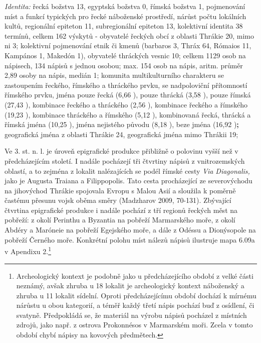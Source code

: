 {\em Identita:} řecká božstva 13, egyptská božstva 0, římská božstva 1, pojmenování míst a funkcí typických pro řecké náboženské prostředí, nárůst počtu lokálních kultů, regionální epiteton 11, subregionální epiteton 13, kolektivní identita 38 termínů, celkem 162 výskytů - obyvatelé řeckých obcí z oblasti Thrákie 20, mimo ni 3; kolektivní pojmenování etnik či kmenů (barbaros 3, Thráx 64, Rómaios 11, Kampános 1, Makedón 1), obyvatelé thráckých vesnic 10; celkem 1129 osob na nápisech, 134 nápisů s jednou osobou; max. 154 osob na nápis, aritm. průměr 2,89 osoby na nápis, medián 1; komunita multikulturního charakteru se zastoupením řeckého, římského a thráckého prvku, se nadpoloviční přítomností římského prvku, jména pouze řecká (6,66 ), pouze thrácká (3,58 ), pouze římská (27,43 ), kombinace řeckého a thráckého (2,56 ), kombinace řeckého a římského (19,23 ), kombinace thráckého a římského (5,12 ), kombinovaná řecká, thrácká a římská jména (10,25 ), jména nejistého původu (8,18 ), beze jména (16,92 ){\bf ;} geografická jména z oblasti Thrákie 24, geografická jména mimo Thrákii 19;

\NC\AR
\HL
\HL
\stoptable

Ve 3. st. n. l. je úroveň epigrafické produkce přibližně o polovinu vyšší než v předcházejícím století. I nadále pocházejí tři čtvrtiny nápisů z vnitrozemských oblastí, a to zejména z lokalit nalézajících se podél římské cesty {\em Via Diagonalis,} jako je Augusta Traiana a Filippopolis. Tato cesta procházející ze severovýchodu na jihovýchod Thrákie spojovala Evropu s Malou Asií a sloužila k poměrně častému přesunu vojsk oběma směry (Madzharov 2009, 70-131). Zbývající čtvrtina epigrafické produkce i nadále pochází z tří regionů řeckých měst na pobřeží: z okolí Perinthu a Byzantia na pobřeží Marmarského moře, z okolí Abdéry a Maróneie na pobřeží Egejského moře, a dále z Odéssu a Dionýsopole na pobřeží Černého moře. Konkrétní polohu míst nálezů nápisů ilustruje mapa 6.09a v Apendixu 2.\footnote{Archeologický kontext je podobně jako u předcházejícího období z velké části neznámý, avšak zhruba u 18  lokalit je archeologický kontext náboženský a zhruba u 11  lokalit sídelní. Oproti předcházejícímu období dochází k mírnému nárůstu u obou kategorií, a téměř každý třetí nápis pochází buď z osídlení, či svatyně. Předpokládá se, že materiál na výrobu nápisů pocházel z místních zdrojů, jako např. z ostrova Prokonnésos v Marmarském moři. Zcela v tomto období chybí nápisy na kovových předmětech.}

